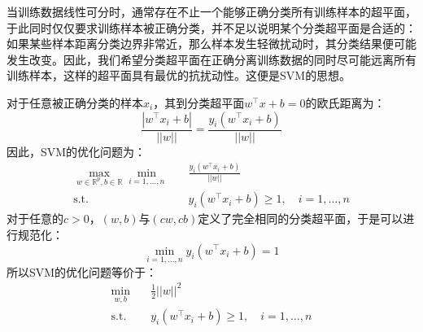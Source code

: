 当训练数据线性可分时，通常存在不止一个能够正确分类所有训练样本的超平面，于此同时仅仅要求训练样本被正确分类，并不足以说明某个分类超平面是合适的：如果某些样本距离分类边界非常近，那么样本发生轻微扰动时，其分类结果便可能发生改变。因此，我们希望分类超平面在正确分离训练数据的同时尽可能远离所有训练样本，这样的超平面具有最优的抗扰动性。这便是\gls{SVM}的思想。\par
对于任意被正确分类的样本$x_i$，其到分类超平面$w^{\top}x+b=0$的欧氏距离为：
\begin{equation*}
	\frac{|w^{\top}x_i+b|}{||w||}=\frac{y_i(w^{\top}x_i+b)}{||w||}
\end{equation*}
因此，SVM的优化问题为：
\begin{equation*}
	\begin{aligned}
		\max_{w\in\mathbb{R}^{p},b\in\mathbb{R}}\min_{i=1,\dots,n}\quad &\frac{y_i(w^{\top}x_i+b)}{||w||} \\
		\operatorname{s.t.}\quad&y_i(w^{\top}x_i+b)\geqslant1,\quad i=1,\dots,n
	\end{aligned}
\end{equation*}
对于任意的$c>0$，$(w,b)$与$(cw,cb)$定义了完全相同的分类超平面，于是可以进行规范化：
\begin{equation*}
	\min_{i=1,\dots,n}y_i(w^{\top}x_i+b)=1
\end{equation*}
所以SVM的优化问题等价于：
\begin{equation*}
	\begin{aligned}
		\min_{w,b}\quad&\frac{1}{2}||w||^2\\
		\operatorname{s.t.}\quad&y_i(w^{\top}x_i+b)\geqslant1,\quad i=1,\dots,n
	\end{aligned}
\end{equation*}